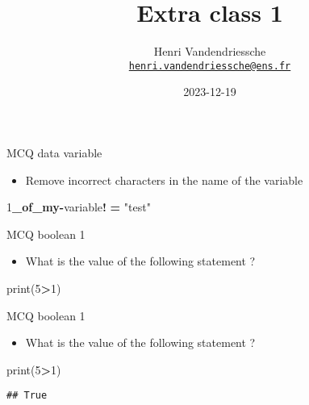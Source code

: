 \documentclass[
  8pt,
  ignorenonframetext,
]{beamer}
\title{Extra class 1}
\author{Henri Vandendriessche\\
\href{mailto:henri.vandendriessche@ens.fr}{\nolinkurl{henri.vandendriessche@ens.fr}}}
\date{2023-12-19}
\newenvironment{Shaded}{\begin{snugshade}}{\end{snugshade}}
\newcommand{\BuiltInTok}[1]{#1}
\newcommand{\DecValTok}[1]{\textcolor[rgb]{0.00,0.00,0.81}{#1}}
\newcommand{\ErrorTok}[1]{\textcolor[rgb]{0.64,0.00,0.00}{\textbf{#1}}}
\newcommand{\NormalTok}[1]{#1}
\newcommand{\OperatorTok}[1]{\textcolor[rgb]{0.81,0.36,0.00}{\textbf{#1}}}
\newcommand{\StringTok}[1]{\textcolor[rgb]{0.31,0.60,0.02}{#1}}
\providecommand{\tightlist}{%
  \setlength{\itemsep}{0pt}\setlength{\parskip}{0pt}}
\begin{document}
\frame{\titlepage}

\begin{frame}[fragile]{MCQ data variable}
\protect\hypertarget{mcq-data-variable}{}
\begin{itemize}
\tightlist
\item
  Remove incorrect characters in the name of the variable
\end{itemize}

\begin{Shaded}
\begin{Highlighting}[]
\DecValTok{1}\ErrorTok{\_of\_my}\OperatorTok{{-}}\NormalTok{variable}\OperatorTok{!} \OperatorTok{=} \StringTok{"test"}
\end{Highlighting}
\end{Shaded}
\end{frame}

\begin{frame}[fragile]{MCQ boolean 1}
\protect\hypertarget{mcq-boolean-1}{}
\begin{itemize}
\tightlist
\item
  What is the value of the following statement ?
\end{itemize}

\begin{Shaded}
\begin{Highlighting}[]
\BuiltInTok{print}\NormalTok{(}\DecValTok{5}\OperatorTok{\textgreater{}}\DecValTok{1}\NormalTok{)}
\end{Highlighting}
\end{Shaded}
\end{frame}

\begin{frame}[fragile]{MCQ boolean 1}
\protect\hypertarget{mcq-boolean-1-1}{}
\begin{itemize}
\tightlist
\item
  What is the value of the following statement ?
\end{itemize}

\begin{Shaded}
\begin{Highlighting}[]
\BuiltInTok{print}\NormalTok{(}\DecValTok{5}\OperatorTok{\textgreater{}}\DecValTok{1}\NormalTok{)}
\end{Highlighting}
\end{Shaded}

\begin{verbatim}
## True
\end{verbatim}
\end{frame}
\end{document}
